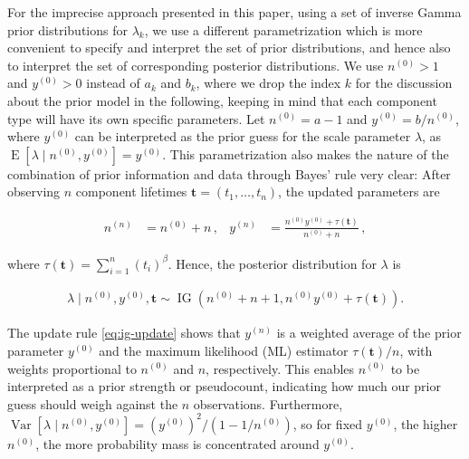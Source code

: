\documentclass[Journal,letterpaper]{ascelike-new}
\renewcommand{\vec}[1]{{\bm#1}}
\newcommand{\uz}{^{(0)}} %
\newcommand{\un}{^{(n)}} %
\newcommand{\E}{\operatorname{E}}
\newcommand{\V}{\operatorname{Var}}
\newcommand{\ig}{\operatorname{IG}}   %
\def\yz{y\uz}
\def\yn{y\un}
\def\nz{n\uz}
\def\nn{n\un}
\def\taut{\tau(\vec{t})}
\begin{document}
For the imprecise approach presented in this paper, using a set of inverse Gamma prior distributions for $\lambda_k$,
we use a different parametrization which is more convenient to specify and interpret the set of prior distributions,
and hence also to interpret the set of corresponding posterior distributions. We use $\nz > 1$ and $\yz > 0$ instead 
of $a_k$ and $b_k$, where we drop the index $k$ for the discussion about the prior model in the following,
keeping in mind that each component type will have its own specific parameters.
Let
$\nz = a - 1$ and
$\yz = b / \nz$,
where $\yz$ can be interpreted as the prior guess for the scale parameter $\lambda$,
as $\E[\lambda\mid\nz,\yz] = \yz$.
This parametrization also makes the nature of the combination
of prior information and data through Bayes' rule very clear:
After observing $n$ component lifetimes $\vec{t} = (t_1, \ldots, t_n)$,
the updated parameters are
\begin{linenomath*}
\begin{align}
\nn &= \nz + n\,, 
&
\yn &=  \frac{\nz \yz + \taut}{\nz + n}\,,
\label{eq:ig-update}
\end{align}
\end{linenomath*}
where $\taut = \sum_{i=1}^n (t_i)^\beta$. %
Hence, the posterior distribution for $\lambda$ is
\begin{linenomath*}
\begin{align}
\lambda \mid \nz, \yz, \vec{t} \sim \ig(\nz + n + 1, \nz \yz + \taut). %
\label{eq:ig-update-alpha}
\end{align}
\end{linenomath*}

The update rule \eqref{eq:ig-update} shows that
$\yn$ is a weighted average of the prior parameter $\yz$ and the maximum likelihood (ML) estimator $\taut/n$,
with weights proportional to $\nz$ and $n$, respectively.
This enables $\nz$ to be interpreted as a prior strength or pseudocount,
indicating how much our prior guess should weigh against the $n$ observations.
Furthermore, $\V[\lambda\mid\nz,\yz] = (\yz)^2 / (1 - 1/\nz)$,
so for fixed $\yz$, the higher $\nz$,
the more probability mass is concentrated around $\yz$. %
\end{document}
